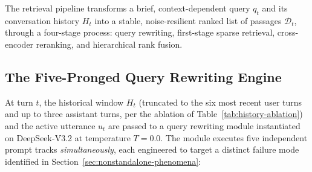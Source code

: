 The retrieval pipeline transforms a brief, context-dependent query $q_t$ and its conversation history $H_t$ into a stable, noise-resilient ranked list of passages $\mathcal{D}_t$, through a four-stage process: query rewriting, first-stage sparse retrieval, cross-encoder reranking, and hierarchical rank fusion.

\subsection{The Five-Pronged Query Rewriting Engine}
\label{subsec:rewriting-engine}

At turn $t$, the historical window $H_t$ (truncated to the six most recent user turns and up to three assistant turns, per the ablation of Table~\ref{tab:history-ablation}) and the active utterance $u_t$ are passed to a query rewriting module instantiated on DeepSeek-V3.2 at temperature $T{=}0.0$. The module executes five independent prompt tracks \emph{simultaneously}, each engineered to target a distinct failure mode identified in Section~\ref{sec:nonstandalone-phenomena}:

